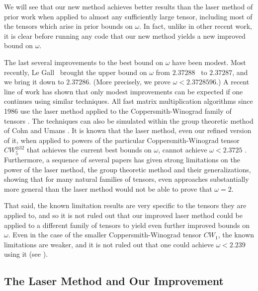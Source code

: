 \PassOptionsToPackage{shortlabels}{enumitem}\documentclass[10pt,a4paper]{article}
\begin{document}
We will see that our new method achieves better results than the laser method of prior work when applied to almost any sufficiently large tensor, including most of the tensors which arise in prior bounds on $\omega$. In fact, unlike in other recent work, it is clear before running any code that our new method yields a new improved bound on $\omega$.



The last several improvements to the best bound on $\omega$ have been modest. Most recently, Le Gall~\cite{legall} brought the upper bound on $\omega$ from $2.37288$~\cite{v12} to $2.37287$, and we bring it down to $2.37286$. (More precisely, we prove $\omega < 2.3728596$.)
A recent line of work has shown that only modest improvements can be expected if one continues using similar techniques. All fast matrix multiplication algorithms since 1986 use the laser method applied to the Coppersmith-Winograd family of tensors \cite{coppersmith}. The techniques can also be simulated within the group theoretic method of Cohn and Umans \cite{cohn2003group,cohn2005group,cohn2013fast}. 
It is known that the laser method, even our refined version of it, when applied to powers of the particular Coppersmith-Winograd tensor $CW^{\otimes 32}_5$ that achieves the current best bounds on $\omega$, cannot achieve $\omega<2.3725$ \cite{ambainis}. 
Furthermore, a sequence of several papers \cite{ambainis,sunfl,blasiak,blasiak2017groups,almanitcs,aw2,Alman19,ChristandlVZ19,blaser2020slice,wojtala2023irreversibility,blasiak2023matrix} has given strong limitations on the power of the laser method, the group theoretic method and their generalizations, showing that for many natural families of tensors, even approaches substantially more general than the laser method would not be able to prove that $\omega=2$. 


That said, the known limitation results are very specific to the tensors they are applied to, and so it is not ruled out that our improved laser method could be applied to a different family of tensors to yield even further improved bounds on $\omega$.
Even in the case of the smaller Coppersmith-Winograd tensor $CW_1$, the known limitations are weaker, and it is not ruled out that one could achieve $\omega<2.239$ using it (see \cite[Table 1]{ambainis}). 


\subsection{The Laser Method and Our Improvement}
\end{document}
